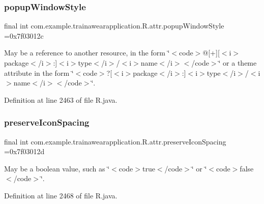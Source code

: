 \subsubsection{\texorpdfstring{popupWindowStyle}{popupWindowStyle}}
{\footnotesize\ttfamily final int com.\+example.\+trainawearapplication.\+R.\+attr.\+popup\+Window\+Style =0x7f03012c\hspace{0.3cm}{\ttfamily [static]}}

May be a reference to another resource, in the form \char`\"{}$<$code$>$@\mbox{[}+\mbox{]}\mbox{[}$<$i$>$package$<$/i$>$\+:\mbox{]}$<$i$>$type$<$/i$>$/$<$i$>$name$<$/i$>$$<$/code$>$\char`\"{} or a theme attribute in the form \char`\"{}$<$code$>$?\mbox{[}$<$i$>$package$<$/i$>$\+:\mbox{]}$<$i$>$type$<$/i$>$/$<$i$>$name$<$/i$>$$<$/code$>$\char`\"{}. 

Definition at line 2463 of file R.\+java.

\mbox{\label{classcom_1_1example_1_1trainawearapplication_1_1_r_1_1attr_aad6bae323d98d568dd9350c79ef4dc6a}} 
\subsubsection{\texorpdfstring{preserveIconSpacing}{preserveIconSpacing}}
{\footnotesize\ttfamily final int com.\+example.\+trainawearapplication.\+R.\+attr.\+preserve\+Icon\+Spacing =0x7f03012d\hspace{0.3cm}{\ttfamily [static]}}

May be a boolean value, such as \char`\"{}$<$code$>$true$<$/code$>$\char`\"{} or \char`\"{}$<$code$>$false$<$/code$>$\char`\"{}. 

Definition at line 2468 of file R.\+java.

\mbox{\label{classcom_1_1example_1_1trainawearapplication_1_1_r_1_1attr_a79e518da24f5ed865fce2997a4d9fbf3}} 
